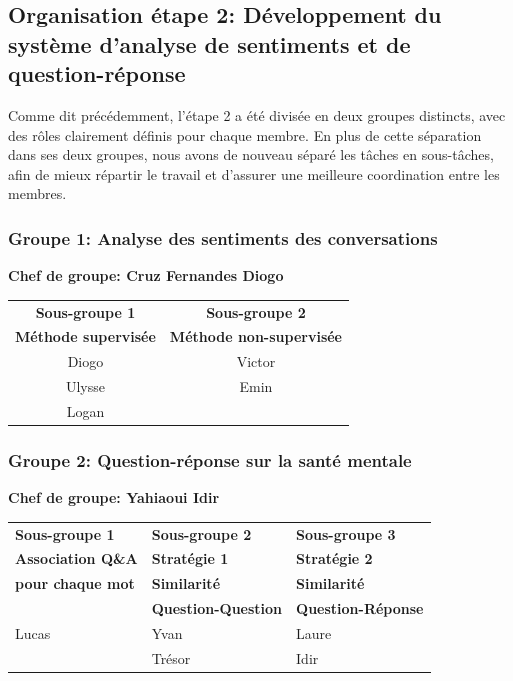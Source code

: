 \documentclass[12pt,a4paper]{report}
\begin{document}
\subsection{Organisation étape 2: Développement du système d'analyse de sentiments et de question-réponse}
Comme dit précédemment, l'étape 2 a été divisée en deux groupes distincts, avec des rôles clairement définis pour chaque membre.
En plus de cette séparation dans ses deux groupes, nous avons de nouveau séparé les tâches en sous-tâches, afin de mieux répartir le travail et d'assurer une meilleure coordination entre les membres.

\subsubsection{Groupe 1: Analyse des sentiments des conversations}
\textbf{Chef de groupe: Cruz Fernandes Diogo}
\begin{center}
\begin{tabular}{@{}cc@{}}
\toprule
\textbf{Sous-groupe 1} & \textbf{Sous-groupe 2} \\
\textbf{Méthode supervisée} & \textbf{Méthode non-supervisée} \\
\midrule
Diogo & Victor\\
Ulysse & Emin\\
Logan &  \\
\bottomrule
\end{tabular}
\end{center}

\subsubsection{Groupe 2: Question-réponse sur la santé mentale}
\textbf{Chef de groupe: Yahiaoui Idir}
\begin{center}
\begin{tabular}{@{}C{4.5cm}|C{4.5cm}|C{4.5cm}@{}}
\toprule
\textbf{Sous-groupe 1} & \textbf{Sous-groupe 2} & \textbf{Sous-groupe 3} \\
\textbf{Association Q\&A } & \textbf{Stratégie 1} & \textbf{Stratégie 2} \\
\textbf{pour chaque mot} & \textbf{Similarité} & \textbf{Similarité}\\
                         & \textbf{Question-Question} & \textbf{Question-Réponse}\\
\midrule
Lucas & Yvan & Laure\\
 & Trésor &  Idir\\
\bottomrule
\end{tabular}
\end{center}
\end{document}
